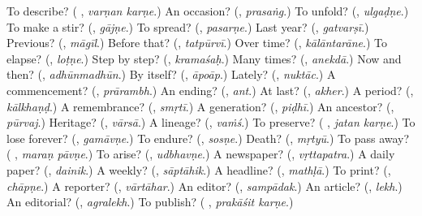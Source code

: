 \begin{tcolorbox}[breakable,colback=teal!4,colframe=teal!35!black,title={Before you move on}]
To describe? (\textbf{ }, \emph{varṇan karṇe}.) An occasion? (\textbf{}, \emph{prasaṅg}.) To unfold? (\textbf{}, \emph{ulgaḍṇe}.) To make a stir? (\textbf{}, \emph{gājṇe}.) To spread? (\textbf{}, \emph{pasarṇe}.) Last year? (\textbf{}, \emph{gatvarṣī}.) Previous? (\textbf{}, \emph{māgīl}.) Before that? (\textbf{}, \emph{tatpūrvī}.) Over time? (\textbf{}, \emph{kālāntarāne}.) To elapse? (\textbf{}, \emph{loṭṇe}.) Step by step? (\textbf{}, \emph{kramaśaḥ}.) Many times? (\textbf{}, \emph{anekdā}.) Now and then? (\textbf{}, \emph{adhūnmadhūn}.) By itself? (\textbf{}, \emph{āpoāp}.) Lately? (\textbf{}, \emph{nuktāc}.) A commencement? (\textbf{}, \emph{prārambh}.) An ending? (\textbf{}, \emph{ant}.) At last? (\textbf{}, \emph{akher}.) A period? (\textbf{}, \emph{kālkhaṇḍ}.) A remembrance? (\textbf{}, \emph{smṛtī}.) A generation? (\textbf{}, \emph{piḍhī}.) An ancestor? (\textbf{}, \emph{pūrvaj}.) Heritage? (\textbf{}, \emph{vārsā}.) A lineage? (\textbf{}, \emph{vaṁś}.) To preserve? (\textbf{ }, \emph{jatan karṇe}.) To lose forever? (\textbf{}, \emph{gamāvṇe}.) To endure? (\textbf{}, \emph{sosṇe}.) Death? (\textbf{}, \emph{mṛtyū}.) To pass away? (\textbf{ }, \emph{maraṇ pāvṇe}.) To arise? (\textbf{}, \emph{udbhavṇe}.) A newspaper? (\textbf{}, \emph{vṛttapatra}.) A daily paper? (\textbf{}, \emph{dainik}.) A weekly? (\textbf{}, \emph{sāptāhik}.) A headline? (\textbf{}, \emph{mathḷā}.) To print? (\textbf{}, \emph{chāpṇe}.) A reporter? (\textbf{}, \emph{vārtāhar}.) An editor? (\textbf{}, \emph{sampādak}.) An article? (\textbf{}, \emph{lekh}.) An editorial? (\textbf{}, \emph{agralekh}.) To publish? (\textbf{ }, \emph{prakāśit karṇe}.)
\end{tcolorbox}
